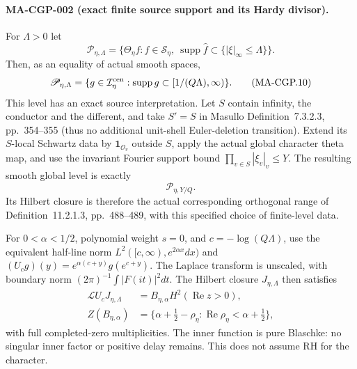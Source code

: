 \paragraph{MA-CGP-002 (exact finite source support and its Hardy divisor).}
For $\Lambda>0$ let
\[
 \mathscr P_{\eta,\Lambda}
  =\{\Theta_\eta f:f\in\mathscr S_\eta,
          \ \operatorname{supp}\widehat f
                     \subset\{|\xi|_\infty\le\Lambda\}\}.
 \tag{MA-CGP.9}
\]
Then, as an equality of actual smooth spaces,
\[
 \mathscr P_{\eta,\Lambda}
   =\{g\in\mathcal I_\eta^{\rm cen}:
                              \operatorname{supp}g\subset[1/(Q\Lambda),\infty)\}.
 \tag{MA-CGP.10}
\]
This level has an exact source interpretation.  Let $S$ contain
infinity, the conductor and the different, and take $S'=S$
in Masullo Definition~7.3.2.3, pp.~354--355 (thus no additional
unit-shell Euler-deletion transition).  Extend its $S$-local
Schwartz data by $\mathbf1_{\mathcal O_v}$ outside $S$,
apply the actual global character theta map, and use the
invariant Fourier support bound $\prod_{v\in S}|\xi_v|_v\le Y$.
The resulting smooth global level is exactly
\[
                  \mathscr P_{\eta,Y/Q}.
 \tag{MA-CGP.11}
\]
Its Hilbert closure is therefore the actual corresponding
orthogonal range of Definition~11.2.1.3, pp.~488--489,
with this specified choice of finite-level data.

For $0<\alpha<1/2$, polynomial weight $s=0$, and
$c=-\log(Q\Lambda)$, use the equivalent half-line norm
$L^2([c,\infty),e^{2\alpha x}dx)$ and
$(U_cg)(y)=e^{\alpha(c+y)}g(e^{c+y})$.
The Laplace transform is unscaled, with boundary norm
$(2\pi)^{-1}\int|F(it)|^2dt$.
The Hilbert closure $J_{\eta,\Lambda}$ then satisfies
\[
 \begin{aligned}
 \mathcal L U_cJ_{\eta,\Lambda}
       &=B_{\eta,\alpha}H^2(\operatorname{Re}z>0),\\
 Z(B_{\eta,\alpha})&=
   \{\alpha+\tfrac12-\rho_\eta:
                         \operatorname{Re}\rho_\eta<\alpha+\tfrac12\},
 \end{aligned}
 \tag{MA-CGP.12}
\]
with full completed-zero multiplicities.  The inner function is
pure Blaschke: no singular inner factor or positive delay remains.
This does not assume RH for the character.

